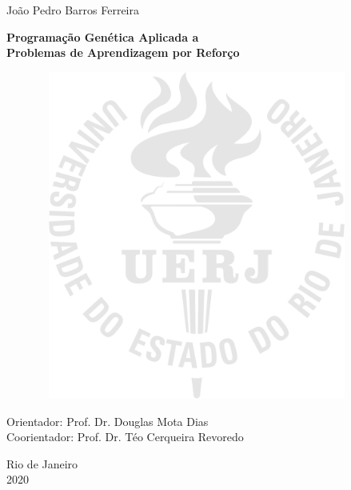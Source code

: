 \begin{center}

João Pedro Barros Ferreira

\vspace{2cm}

\textbf{Programação Genética Aplicada a \\Problemas de Aprendizagem por Reforço}

\vspace{1.0cm}

\begin{figure}[hbt!]
\begin{center}
\includegraphics[width=10.48cm,height=10.8cm]{00_pretextual/figuras/logo_uerj_gnd_pb.png}
\end{center}
\end{figure}

\vspace{-9cm}

\begin{flushright}
	\parbox{8cm}{
		}
\end{flushright}

\vspace{4.0cm}

Orientador: Prof. Dr. Douglas Mota Dias\\
Coorientador: Prof. Dr. Téo Cerqueira Revoredo\\

\par\vfill

Rio de Janeiro\\2020

\end{center}